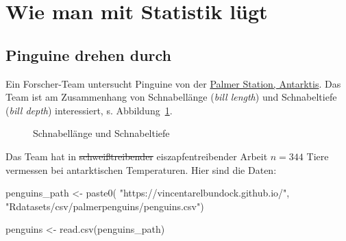 \documentclass[
  letterpaper,
]{scrbook}
\newenvironment{Shaded}{\begin{snugshade}}{\end{snugshade}}
\newcommand{\FunctionTok}[1]{\textcolor[rgb]{0.28,0.35,0.67}{#1}}
\newcommand{\NormalTok}[1]{\textcolor[rgb]{0.00,0.23,0.31}{#1}}
\newcommand{\OtherTok}[1]{\textcolor[rgb]{0.00,0.23,0.31}{#1}}
\newcommand{\StringTok}[1]{\textcolor[rgb]{0.13,0.47,0.30}{#1}}
\theoremstyle{definition}
\theoremstyle{definition}
\theoremstyle{definition}
\theoremstyle{remark}
\begin{document}
\section{Wie man mit Statistik
lügt}\label{wie-man-mit-statistik-luxfcgt-5}

\subsection{Pinguine drehen durch}\label{pinguine-drehen-durch}

Ein Forscher-Team untersucht Pinguine von der
\href{https://pallter.marine.rutgers.edu/}{Palmer Station, Antarktis}.
Das Team ist am Zusammenhang von Schnabellänge (\emph{bill length}) und
Schnabeltiefe (\emph{bill depth}) interessiert, s.
Abbildung~\ref{fig-peng-bill}.

\begin{figure}


\caption{\label{fig-peng-bill}Schnabellänge und Schnabeltiefe}

\end{figure}%

Das Team hat in \st{schweißtreibender} eiszapfentreibender Arbeit
\(n=344\) Tiere vermessen bei antarktischen Temperaturen. Hier sind die
Daten:

\begin{Shaded}
\begin{Highlighting}[]
\NormalTok{penguins\_path }\OtherTok{\textless{}{-}} \FunctionTok{paste0}\NormalTok{(}
  \StringTok{"https://vincentarelbundock.github.io/"}\NormalTok{,}
  \StringTok{"Rdatasets/csv/palmerpenguins/penguins.csv"}\NormalTok{)}

\NormalTok{penguins }\OtherTok{\textless{}{-}} \FunctionTok{read.csv}\NormalTok{(penguins\_path)}
\end{Highlighting}
\end{Shaded}
\end{document}
